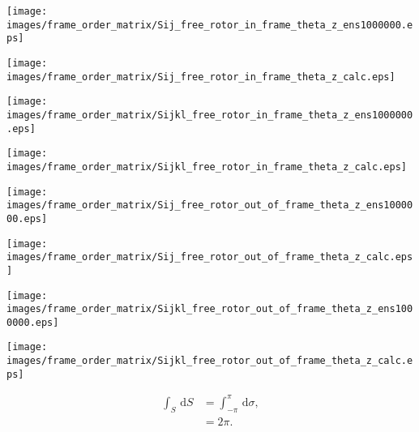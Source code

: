 \documentclass[a4paper,11pt,twoside,openright]{book}
\def\lthtmlcheckvsize{\ifdim\ht\sizebox<\vsize 
  \ifdim\wd\sizebox<\hsize\expandafter\hfill\fi \expandafter\vfill
  \else\expandafter\vss\fi}%
\begin{document}
{\newpage\clearpage
{}%
\texttt{[image: images/frame\_order\_matrix/Sij\_free\_rotor\_in\_frame\_theta\_z\_ens1000000.eps]}%
\lthtmlpictureZ
\lthtmlcheckvsize\clearpage}

{\newpage\clearpage
{}%
\texttt{[image: images/frame\_order\_matrix/Sij\_free\_rotor\_in\_frame\_theta\_z\_calc.eps]}%
\lthtmlpictureZ
\lthtmlcheckvsize\clearpage}

{\newpage\clearpage
{}%
\texttt{[image: images/frame\_order\_matrix/Sijkl\_free\_rotor\_in\_frame\_theta\_z\_ens1000000.eps]}%
\lthtmlpictureZ
\lthtmlcheckvsize\clearpage}

{\newpage\clearpage
{}%
\texttt{[image: images/frame\_order\_matrix/Sijkl\_free\_rotor\_in\_frame\_theta\_z\_calc.eps]}%
\lthtmlpictureZ
\lthtmlcheckvsize\clearpage}

{\newpage\clearpage
{}%
\texttt{[image: images/frame\_order\_matrix/Sij\_free\_rotor\_out\_of\_frame\_theta\_z\_ens1000000.eps]}%
\lthtmlpictureZ
\lthtmlcheckvsize\clearpage}

{\newpage\clearpage
{}%
\texttt{[image: images/frame\_order\_matrix/Sij\_free\_rotor\_out\_of\_frame\_theta\_z\_calc.eps]}%
\lthtmlpictureZ
\lthtmlcheckvsize\clearpage}

{\newpage\clearpage
{}%
\texttt{[image: images/frame\_order\_matrix/Sijkl\_free\_rotor\_out\_of\_frame\_theta\_z\_ens1000000.eps]}%
\lthtmlpictureZ
\lthtmlcheckvsize\clearpage}

{\newpage\clearpage
{}%
\texttt{[image: images/frame\_order\_matrix/Sijkl\_free\_rotor\_out\_of\_frame\_theta\_z\_calc.eps]}%
\lthtmlpictureZ
\lthtmlcheckvsize\clearpage}

{\newpage\clearpage
\setcounter{equation}{17}
%
\begin{subequations}\begin{align}
\int_S \,\mathrm{d}S &= \int_{-\pi}^{\pi} \,\mathrm{d}\sigma , \\
&= 2\pi .
\end{align}\end{subequations}%
\lthtmldisplayZ
\lthtmlcheckvsize\clearpage}
\end{document}
